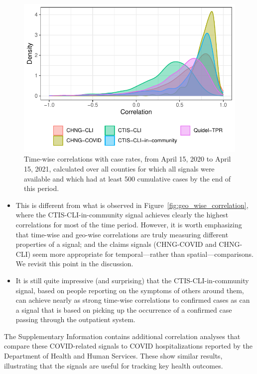 \documentclass[9pt,twocolumn,twoside,lineno]{pnas-new}
\begin{document}
\begin{figure}[t]
  \includegraphics[width=\columnwidth]{fig/time_wise_correlation.pdf}
  \caption{Time-wise correlations with case rates, from April 15, 2020 to April
    15, 2021, calculated over all counties for which all signals were available
    and which had at least 500 cumulative cases by the end of this period.}
  \label{fig:time_wise_correlation}
\end{figure}

\begin{itemize}
\item This is different from what is observed in
  Figure~\ref{fig:geo_wise_correlation}, where the CTIS-CLI-in-community signal
  achieves clearly the highest correlations for most of the time period.
  However, it is worth emphasizing that time-wise and geo-wise
  correlations are truly measuring different properties of a signal; and the
  claims signals (CHNG-COVID and CHNG-CLI) seem more appropriate for
  temporal---rather than spatial---comparisons.  We revisit this point in the
  discussion.

\item It is still quite impressive (and surprising) that the
  CTIS-CLI-in-community signal, based on people reporting on the symptoms of
  others around them, can achieve  nearly as strong time-wise correlations to
  confirmed cases as can a signal that is based on picking up the occurrence of
  a confirmed case passing through the outpatient system.
\end{itemize}
The Supplementary Information contains additional correlation analyses that
compare these COVID-related signals to COVID hospitalizations reported by the
Department of Health and Human Services. These show similar results,
illustrating that the signals are useful for tracking key health outcomes.
\end{document}
